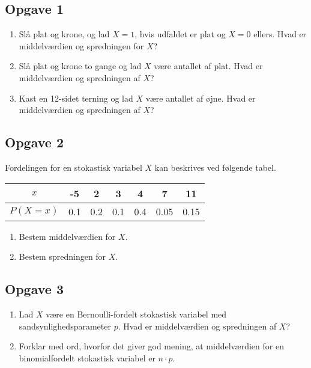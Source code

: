 \subsection*{Opgave 1}
\begin{enumerate}[label=\roman*)]
\item Slå plat og krone, og lad $X=1$, hvis udfaldet er plat og $X=0$ ellers. Hvad er middelværdien og spredningen for $X$?
\item Slå plat og krone to gange og lad $X$ være antallet af plat. Hvad er middelværdien og spredningen af $X$?
\item Kast en 12-sidet terning og lad $X$ være antallet af øjne. Hvad er middelværdien og spredningen af $X$?

\end{enumerate}

\subsection*{Opgave 2}

Fordelingen for en stokastisk variabel $X$ kan beskrives ved følgende tabel.

\begin{center}
	\begin{tabular}{c|c|c|c|c|c|c}
		$x$ & -5 & 2 & 3 & 4 & 7 & 11 \\
		\hline
		$P(X = x)$ & 0.1 & 0.2 & 0.1 & 0.4 & 0.05 & 0.15
	\end{tabular}
\end{center}

\begin{enumerate}[label=\roman*)]
	\item Bestem middelværdien for $X$.
	\item Bestem spredningen for $X$.
\end{enumerate}

\subsection*{Opgave 3}
\begin{enumerate}[label=\roman*)]
\item Lad $X$ være en Bernoulli-fordelt stokastisk variabel med sandsynlighedsparameter $p$. Hvad er middelværdien og spredningen af $X$?
\item Forklar med ord, hvorfor det giver god mening, at middelværdien for en binomialfordelt stokastisk variabel er $n\cdot p$. 
\end{enumerate}

